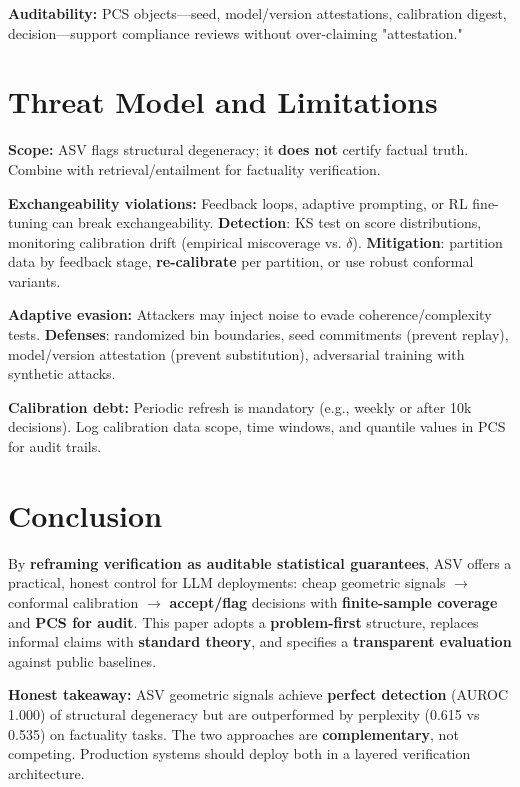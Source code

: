 \documentclass[11pt]{article}
\begin{document}
\textbf{Auditability:} PCS objects---seed, model/version attestations, calibration digest, decision---support compliance reviews without over-claiming "attestation."

\section{Threat Model and Limitations}
\label{sec:limitations}

\textbf{Scope:} ASV flags structural degeneracy; it \textbf{does not} certify factual truth. Combine with retrieval/entailment for factuality verification.

\textbf{Exchangeability violations:} Feedback loops, adaptive prompting, or RL fine-tuning can break exchangeability. \textbf{Detection}: KS test on score distributions, monitoring calibration drift (empirical miscoverage vs. $\delta$). \textbf{Mitigation}: partition data by feedback stage, \textbf{re-calibrate} per partition, or use robust conformal variants.

\textbf{Adaptive evasion:} Attackers may inject noise to evade coherence/complexity tests. \textbf{Defenses}: randomized bin boundaries, seed commitments (prevent replay), model/version attestation (prevent substitution), adversarial training with synthetic attacks.

\textbf{Calibration debt:} Periodic refresh is mandatory (e.g., weekly or after 10k decisions). Log calibration data scope, time windows, and quantile values in PCS for audit trails.

\section{Conclusion}
\label{sec:conclusion}

By \textbf{reframing verification as auditable statistical guarantees}, ASV offers a practical, honest control for LLM deployments: cheap geometric signals $\rightarrow$ conformal calibration $\rightarrow$ \textbf{accept/flag} decisions with \textbf{finite-sample coverage} and \textbf{PCS for audit}. This paper adopts a \textbf{problem-first} structure, replaces informal claims with \textbf{standard theory}, and specifies a \textbf{transparent evaluation} against public baselines.

\textbf{Honest takeaway:} ASV geometric signals achieve \textbf{perfect detection} (AUROC 1.000) of structural degeneracy but are outperformed by perplexity (0.615 vs 0.535) on factuality tasks. The two approaches are \textbf{complementary}, not competing. Production systems should deploy both in a layered verification architecture.
\end{document}
